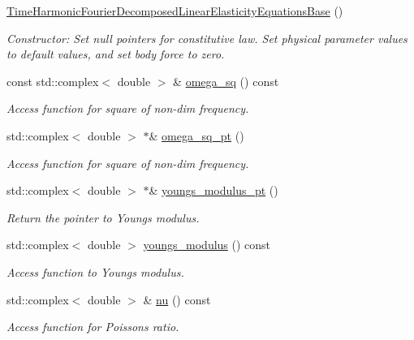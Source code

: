 \begin{DoxyCompactItemize}
\hyperlink{classoomph_1_1TimeHarmonicFourierDecomposedLinearElasticityEquationsBase_a8c30a3f47a37399b416c493d81504406}{Time\+Harmonic\+Fourier\+Decomposed\+Linear\+Elasticity\+Equations\+Base} ()
\begin{DoxyCompactList}\small\item\em Constructor\+: Set null pointers for constitutive law. Set physical parameter values to default values, and set body force to zero. \end{DoxyCompactList}\item 
const std\+::complex$<$ double $>$ \& \hyperlink{classoomph_1_1TimeHarmonicFourierDecomposedLinearElasticityEquationsBase_af24d84d32f712a3005f4dd630b503676}{omega\+\_\+sq} () const
\begin{DoxyCompactList}\small\item\em Access function for square of non-\/dim frequency. \end{DoxyCompactList}\item 
std\+::complex$<$ double $>$ $\ast$\& \hyperlink{classoomph_1_1TimeHarmonicFourierDecomposedLinearElasticityEquationsBase_acc4ef01fcf7436ef9bb7958c3bf59763}{omega\+\_\+sq\+\_\+pt} ()
\begin{DoxyCompactList}\small\item\em Access function for square of non-\/dim frequency. \end{DoxyCompactList}\item 
std\+::complex$<$ double $>$ $\ast$\& \hyperlink{classoomph_1_1TimeHarmonicFourierDecomposedLinearElasticityEquationsBase_a36aad144d015678c13d506497a6bb3a2}{youngs\+\_\+modulus\+\_\+pt} ()
\begin{DoxyCompactList}\small\item\em Return the pointer to Young\textquotesingle{}s modulus. \end{DoxyCompactList}\item 
std\+::complex$<$ double $>$ \hyperlink{classoomph_1_1TimeHarmonicFourierDecomposedLinearElasticityEquationsBase_a859fdaada3e7ae1176a962fcb433ccb1}{youngs\+\_\+modulus} () const
\begin{DoxyCompactList}\small\item\em Access function to Young\textquotesingle{}s modulus. \end{DoxyCompactList}\item 
std\+::complex$<$ double $>$ \& \hyperlink{classoomph_1_1TimeHarmonicFourierDecomposedLinearElasticityEquationsBase_a65802eedd9aa3abb54efd7d2125f27b9}{nu} () const
\begin{DoxyCompactList}\small\item\em Access function for Poisson\textquotesingle{}s ratio. \end{DoxyCompactList}\item 

\end{DoxyCompactItemize}
